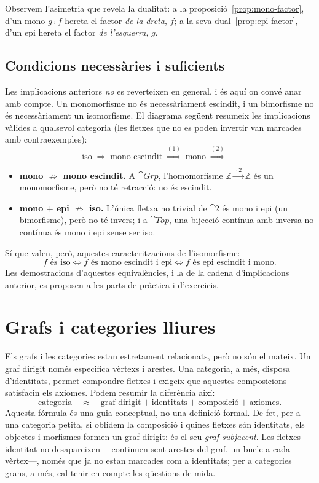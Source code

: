 Observem l'asimetria que revela la dualitat: a la proposició~\ref{prop:mono-factor}, d'un mono $g\comp f$ hereta el factor \emph{de la dreta}, $f$; a la seva dual~\ref{prop:epi-factor}, d'un epi hereta el factor \emph{de l'esquerra}, $g$.

\subsection{Condicions necessàries i suficients}

Les implicacions anteriors \emph{no} es reverteixen en general, i és aquí on convé anar amb compte. Un monomorfisme no és necessàriament escindit, i un bimorfisme no és necessàriament un isomorfisme. El diagrama següent resumeix les implicacions vàlides a qualsevol categoria (les fletxes que no es poden invertir van marcades amb contraexemples):
\[
\text{iso} \;\Longrightarrow\; \text{mono escindit} \;\overset{(1)}{\Longrightarrow}\; \text{mono} \;\overset{(2)}{\Longrightarrow}\; \text{---}
\]
\begin{itemize}
\item[(1)] \textbf{mono $\not\Rightarrow$ mono escindit.} A $\cat{Grp}$, l'homomorfisme $\mathbb{Z}\xrightarrow{\,\cdot 2\,}\mathbb{Z}$ és un monomorfisme, però no té retracció: no és escindit.
\item[(2)] \textbf{mono $+$ epi $\not\Rightarrow$ iso.} L'única fletxa no trivial de $\cat{2}$ és mono i epi (un bimorfisme), però no té invers; i a $\cat{Top}$, una bijecció contínua amb inversa no contínua és mono i epi sense ser iso.
\end{itemize}
Sí que valen, però, aquestes caracteritzacions de l'isomorfisme:
\[
f \text{ és iso} \iff f \text{ és mono escindit i epi} \iff f \text{ és epi escindit i mono}.
\]
Les demostracions d'aquestes equivalències, i la de la cadena d'implicacions anterior, es proposen a les parts de pràctica i d'exercicis.

\section{Grafs i categories lliures}\label{sec:grafs-lliures}

Els grafs i les categories estan estretament relacionats, però no són el mateix. Un graf dirigit només especifica vèrtexs i arestes. Una categoria, a més, disposa d'identitats, permet compondre fletxes i exigeix que aquestes composicions satisfacin els axiomes. Podem resumir la diferència així:
\[
\text{categoria}
\quad\approx\quad
\text{graf dirigit}
+
\text{identitats}
+
\text{composició}
+
\text{axiomes}.
\]
Aquesta fórmula és una guia conceptual, no una definició formal. De fet, per a una categoria petita, si oblidem la composició i quines fletxes són identitats, els objectes i morfismes formen un graf dirigit: és el seu \emph{graf subjacent}. Les fletxes identitat no desapareixen ---continuen sent arestes del graf, un bucle a cada vèrtex---, només que ja no estan marcades com a identitats; per a categories grans, a més, cal tenir en compte les qüestions de mida.

